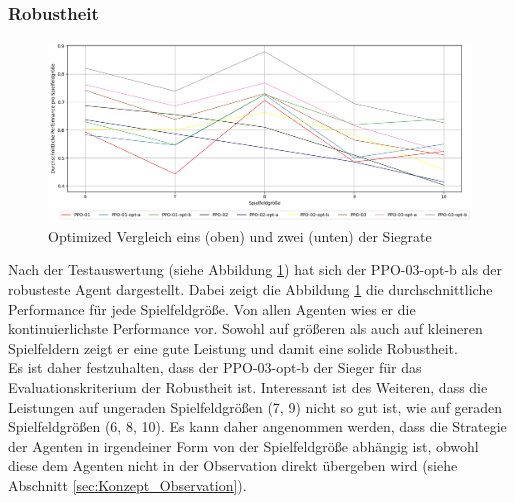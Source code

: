 \subsubsection{Robustheit}
\begin{figure}[H]
	\centering
	\includegraphics[scale=0.4517]{Abbildungen/Evaluation/optimized-robustheit.png}
	\caption[Optimized Vergleich Siegrate]{Optimized Vergleich eins (oben) und zwei (unten) der Siegrate}
	\label{fig:Evaluation_Robustheit_Optimized}
\end{figure}
Nach der Testauswertung (siehe Abbildung \ref{fig:Evaluation_Robustheit_Optimized}) hat sich der PPO-03-opt-b als der robusteste Agent dargestellt.
Dabei zeigt die Abbildung \ref{fig:Evaluation_Robustheit_Optimized} die durchschnittliche Performance für jede Spielfeldgröße.
Von allen Agenten wies er die kontinuierlichste Performance vor. Sowohl auf größeren als auch auf kleineren Spielfeldern zeigt er eine gute Leistung und damit eine solide Robustheit.\\
Es ist daher festzuhalten, dass der PPO-03-opt-b der Sieger für das Evaluationskriterium der Robustheit ist.
Interessant ist des Weiteren, dass die Leistungen auf ungeraden Spielfeldgrößen (7, 9) nicht so gut ist, wie auf geraden Spielfeldgrößen (6, 8, 10). Es kann daher angenommen werden, dass die Strategie der Agenten in irgendeiner Form von der Spielfeldgröße abhängig ist, obwohl diese dem Agenten nicht in der Observation direkt übergeben wird (siehe Abschnitt \ref{sec:Konzept_Observation}).


